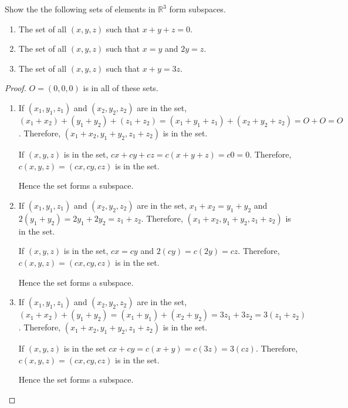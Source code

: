 \begin{exercise}
    Show the the following sets of elements in $\mathbb{R}^{3}$ form subspaces.
    \begin{enumerate}[label={(\alph*)}]
        \item The set of all $(x, y, z)$ such that $x + y + z = 0$.
        \item The set of all $(x, y, z)$ such that $x = y$ and $2y = z$.
        \item The set of all $(x, y, z)$ such that $x + y = 3z$.
    \end{enumerate}
\end{exercise}

\begin{proof}
    $O = (0, 0, 0)$ is in all of these sets.

    \begin{enumerate}[label={(\alph*)}]
        \item If $(x_{1}, y_{1}, z_{1})$ and $(x_{2}, y_{2}, z_{2})$ are in the set, $(x_{1} + x_{2}) + (y_{1} + y_{2}) + (z_{1} + z_{2}) = (x_{1} + y_{1} + z_{1}) + (x_{2} + y_{2} + z_{2}) = O + O = O$. Therefore, $(x_{1} + x_{2}, y_{1} + y_{2}, z_{1} + z_{2})$ is in the set.

              If $(x, y, z)$ is in the set, $cx + cy + cz = c(x + y + z) = c0 = 0$. Therefore, $c(x, y, z) = (cx, cy, cz)$ is in the set.

              Hence the set forms a subspace.
        \item If $(x_{1}, y_{1}, z_{1})$ and $(x_{2}, y_{2}, z_{2})$ are in the set, $x_{1} + x_{2} = y_{1} + y_{2}$ and $2(y_{1} + y_{2}) = 2y_{1} + 2y_{2} = z_{1} + z_{2}$. Therefore, $(x_{1} + x_{2}, y_{1} + y_{2}, z_{1} + z_{2})$ is in the set.

              If $(x, y, z)$ is in the set, $cx = cy$ and $2(cy) = c(2y) = cz$. Therefore, $c(x, y, z) = (cx, cy, cz)$ is in the set.

              Hence the set forms a subspace.
        \item If $(x_{1}, y_{1}, z_{1})$ and $(x_{2}, y_{2}, z_{2})$ are in the set, $(x_{1} + x_{2}) + (y_{1} + y_{2}) = (x_{1} + y_{1}) + (x_{2} + y_{2}) = 3z_{1} + 3z_{2} = 3(z_{1} + z_{2})$. Therefore, $(x_{1} + x_{2}, y_{1} + y_{2}, z_{1} + z_{2})$ is in the set.

              If $(x, y, z)$ is in the set $cx + cy = c(x + y) = c(3z) = 3(cz)$. Therefore, $c(x, y, z) = (cx, cy, cz)$ is in the set.

              Hence the set forms a subspace.
    \end{enumerate}
\end{proof}

